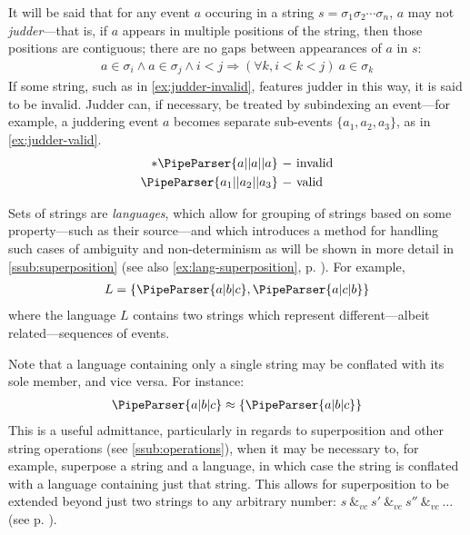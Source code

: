 \documentclass[a4paper,12pt,leqno]{article}
\newcommand{\vph}[1]{\vphantom{#1}}
\newcommand{\ebox}[1]{\fbox{$\vph{'(),}#1$}}
\newcommand{\spvc}{~\&_{v\!c}~}
\newcommand{\EventString}[1]{%
	\renewcommand*{\do}[1]{\ebox{##1}}%
	\PipeParser{#1}%
}
\begin{document}
It will be said that for any event $a$ occuring in a string $s = \sigma_1\sigma_2\cdots\sigma_n$, $a$ may not \textit{judder}---that is, if $a$ appears in multiple positions of the string, then those positions are contiguous; there are no gaps between appearances of $a$ in $s$:
\begin{align}\label{impl:contiguous-events}
	a \in \sigma_i \wedge a \in \sigma_j \wedge i < j \Longrightarrow (\forall k, i < k < j)~ a \in \sigma_k
\end{align}
If some string, such as in \cref{ex:judder-invalid}, features judder in this way, it is said to be invalid. Judder can, if necessary, be treated by subindexing an event---for example, a juddering event $a$ becomes separate sub-events $\{a_1, a_2, a_3\}$, as in \cref{ex:judder-valid}.
\begin{subequations}
	\begin{align}
		* \EventString{a|{}|a|{}|a}\label{ex:judder-invalid} ~-~& \text{invalid}\\
		\EventString{a_1|{}|a_2|{}|a_3}\label{ex:judder-valid} ~-~& \text{valid}
	\end{align}
\end{subequations}

Sets of strings are \textit{languages}, which allow for grouping of strings based on some property---such as their source---and which introduces a method for handling such cases of ambiguity and non-determinism as will be shown in more detail in \cref{ssub:superposition} (see also \cref{ex:lang-superposition}, p. \pageref{ex:lang-superposition}). For example,
\begin{align}
	L = \{\EventString{a|b|c}, \EventString{a|c|b}\}
\end{align}
where the language $L$ contains two strings which represent different---albeit related---sequences of events.

Note that a language containing only a single string may be conflated with its sole member, and vice versa. For instance:
\begin{align}
	\EventString{a|b|c} \approx \{\EventString{a|b|c}\}
\end{align}
This is a useful admittance, particularly in regards to superposition and other string operations (see \cref{ssub:operations}), when it may be necessary to, for example, superpose a string and a language, in which case the string is conflated with a language containing just that string. This allows for superposition to be extended beyond just two strings to any arbitrary number: $s \spvc s' \spvc s'' \spvc \ldots$ (see p. \pageref{def:vc-superposition}).\label{pt:conflation}
\end{document}
